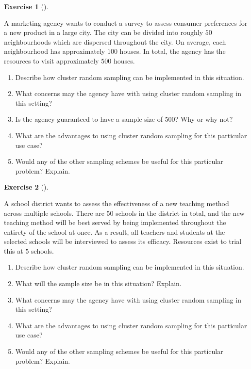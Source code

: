 \documentclass[
  letterpaper,
  DIV=11,
  numbers=noendperiod]{scrreprt}
\providecommand{\tightlist}{%
  \setlength{\itemsep}{0pt}\setlength{\parskip}{0pt}}\usepackage{longtable,booktabs,array}
\theoremstyle{definition}
\newtheorem{exercise}{Exercise}[chapter]
\theoremstyle{definition}
\theoremstyle{definition}
\theoremstyle{remark}
\begin{document}
\begin{exercise}[]\protect\hypertarget{exr-10.12}{}\label{exr-10.12}

A marketing agency wants to conduct a survey to assess consumer
preferences for a new product in a large city. The city can be divided
into roughly \(50\) neighbourhoods which are dispersed throughout the
city. On average, each neighbourhood has approximately \(100\) houses.
In total, the agency has the resources to visit approximately \(500\)
houses.

\begin{enumerate}
\def\labelenumi{\alph{enumi}.}
\tightlist
\item
  Describe how cluster random sampling can be implemented in this
  situation.
\item
  What concerns may the agency have with using cluster random sampling
  in this setting?
\item
  Is the agency guaranteed to have a sample size of \(500\)? Why or why
  not?
\item
  What are the advantages to using cluster random sampling for this
  particular use case?
\item
  Would any of the other sampling schemes be useful for this particular
  problem? Explain.
\end{enumerate}

\end{exercise}

\begin{exercise}[]\protect\hypertarget{exr-10.13}{}\label{exr-10.13}

A school district wants to assess the effectiveness of a new teaching
method across multiple schools. There are \(50\) schools in the district
in total, and the new teaching method will be best served by being
implemented throughout the entirety of the school at once. As a result,
all teachers and students at the selected schools will be interviewed to
assess its efficacy. Resources exist to trial this at \(5\) schools.

\begin{enumerate}
\def\labelenumi{\alph{enumi}.}
\tightlist
\item
  Describe how cluster random sampling can be implemented in this
  situation.
\item
  What will the sample size be in this situation? Explain.
\item
  What concerns may the agency have with using cluster random sampling
  in this setting?
\item
  What are the advantages to using cluster random sampling for this
  particular use case?
\item
  Would any of the other sampling schemes be useful for this particular
  problem? Explain.
\end{enumerate}

\end{exercise}
\end{document}
